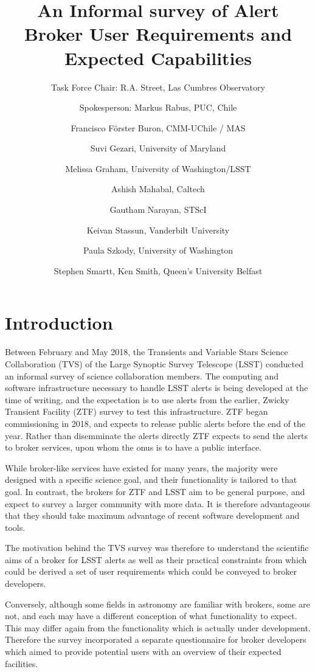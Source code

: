 \documentclass{article}
\begin{document}
\title{An Informal survey of Alert Broker User Requirements and Expected Capabilities}

\author{Task Force Chair: R.A. Street, Las Cumbres Observatory\\
\and
Spokesperson: Markus Rabus, PUC, Chile\\
\and
Francisco Förster Buron, CMM-UChile / MAS
\and
Suvi Gezari, University of Maryland
\and
Melissa Graham, University of Washington/LSST
\and
Ashish Mahabal, Caltech
\and
Gautham Narayan, STScI
\and
Keivan Stassun, Vanderbilt University
\and
Paula Szkody, University of Washington
\and
Stephen Smartt, Ken Smith, Queen’s University Belfast}

\maketitle

\section{Introduction}
Between February and May 2018, the Transients and Variable Stars Science Collaboration (TVS) of the Large Synoptic Survey Telescope (LSST) conducted an informal survey of science collaboration members.  The computing and software infrastructure necessary to handle LSST alerts is being developed at the time of writing, and the expectation is to use alerts from the earlier, Zwicky Transient Facility (ZTF) survey to test this infrastructure.  ZTF began commissioning in 2018, and expects to release public alerts before the end of the year.  Rather than disemminate the alerts directly ZTF expects to send the alerts to broker services, upon whom the onus is to have a public interface.  

While broker-like services have existed for many years, the majority were designed with a specific science goal, and their functionality is tailored to that goal.  In contrast, the brokers for ZTF and LSST aim to be general purpose, and expect to survey a larger community with more data.  It is therefore advantageous that they should take maximum advantage of recent software development and tools.  

The motivation behind the TVS survey was therefore to understand the scientific aims of a broker for LSST alerts as well as their practical constraints from which could be derived a set of user requirements which could be conveyed to broker developers.

Conversely, although some fields in astronomy are familiar with brokers, some are not, and each may have a different conception of what functionality to expect.  This may differ again from the functionality which is actually under development.  Therefore the survey incorporated a separate questionnaire for broker developers which aimed to provide potential users with an overview of their expected facilities.  
\end{document}
